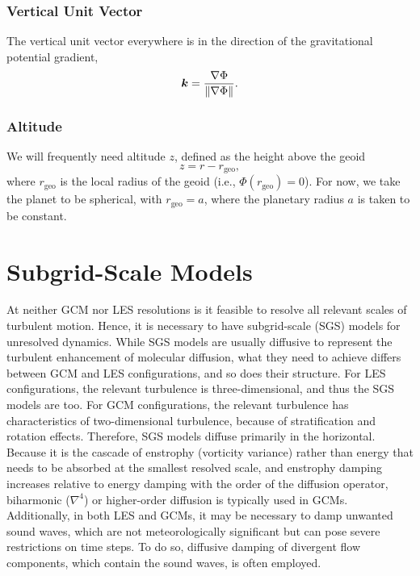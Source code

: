 \documentclass{report}
\begin{document}
\subsection{Vertical Unit Vector}

The vertical unit vector everywhere is in the direction of the gravitational potential gradient,
\begin{equation}\label{e:vert_unit_vector}
\boldsymbol{{k}} = \frac{\nabla \Phi}{\|\nabla\Phi\|}.
\end{equation}

\subsection{Altitude}

We will frequently need altitude $z$, defined as the height above the geoid 
\begin{equation}
z=r-r_{\mathrm{geo}}, 
\end{equation}
where  $r_{\mathrm{geo}}$ is the local radius of the geoid (i.e., $\Phi(r_{\mathrm{geo}})=0$). For now, we take the planet to be spherical, with $r_{\mathrm{geo}} = a$, where the planetary radius $a$ is taken to be constant.

\chapter{Subgrid-Scale Models}
\label{sec:sgs_models}

At neither GCM nor LES resolutions is it feasible to resolve all relevant scales of turbulent motion. Hence, it is necessary to have subgrid-scale (SGS) models for unresolved dynamics. While SGS models are usually diffusive to represent the turbulent enhancement of molecular diffusion,  what they need to achieve differs between GCM and LES configurations, and so does their structure.  For LES configurations, the relevant turbulence is three-dimensional, and thus the SGS models are too. For GCM configurations, the relevant turbulence has characteristics of two-dimensional turbulence, because of stratification and rotation effects. Therefore, SGS models diffuse primarily in the horizontal. Because it is the cascade of enstrophy (vorticity variance) rather than energy that needs to be absorbed at the smallest resolved scale, and enstrophy damping increases relative to energy damping with the order of the diffusion operator, biharmonic ($\nabla^4$) or higher-order diffusion is typically used in GCMs. Additionally, in both LES and GCMs, it may be necessary to damp unwanted sound waves, which are not meteorologically significant but can pose severe restrictions on time steps. To do so, diffusive damping of divergent flow components, which contain the sound waves, is often employed. 
\end{document}
